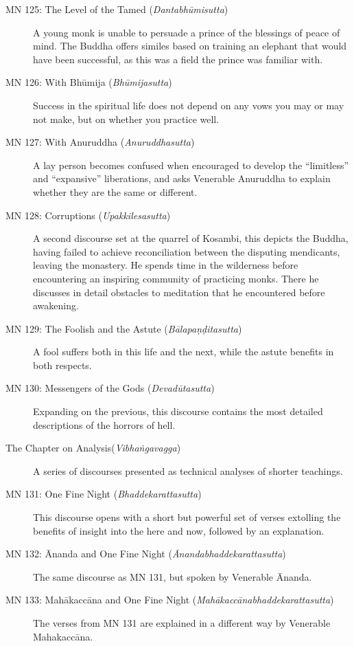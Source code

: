 \documentclass[12pt,openany]{book}%
\begin{document}
\begin{description}
\item[MN 125: The Level of the Tamed (\textit{\textsanskrit{Dantabhūmisutta}})] A young monk is unable to persuade a prince of the blessings of peace of mind. The Buddha offers similes based on training an elephant that would have been successful, as this was a field the prince was familiar with.%
\item[MN 126: With \textsanskrit{Bhūmija} (\textit{\textsanskrit{Bhūmijasutta}})] Success in the spiritual life does not depend on any vows you may or may not make, but on whether you practice well.%
\item[MN 127: With Anuruddha (\textit{\textsanskrit{Anuruddhasutta}})] A lay person becomes confused when encouraged to develop the “limitless” and “expansive” liberations, and asks Venerable Anuruddha to explain whether they are the same or different.%
\item[MN 128: Corruptions (\textit{\textsanskrit{Upakkilesasutta}})] A second discourse set at the quarrel of Kosambi, this depicts the Buddha, having failed to achieve reconciliation between the disputing mendicants, leaving the monastery. He spends time in the wilderness before encountering an inspiring community of practicing monks. There he discusses in detail obstacles to meditation that he encountered before awakening.%
\item[MN 129: The Foolish and the Astute (\textit{\textsanskrit{Bālapaṇḍitasutta}})] A fool suffers both in this life and the next, while the astute benefits in both respects.%
\item[MN 130: Messengers of the Gods (\textit{\textsanskrit{Devadūtasutta}})] Expanding on the previous, this discourse contains the most detailed descriptions of the horrors of hell.%
\item[The Chapter on Analysis(\textit{\textsanskrit{Vibhaṅgavagga}})] A series of discourses presented as technical analyses of shorter teachings.%
\item[MN 131: One Fine Night (\textit{\textsanskrit{Bhaddekarattasutta}})] This discourse opens with a short but powerful set of verses extolling the benefits of insight into the here and now, followed by an explanation.%
\item[MN 132: Ānanda and One Fine Night (\textit{\textsanskrit{Ānandabhaddekarattasutta}})] The same discourse as MN 131, but spoken by Venerable Ānanda.%
\item[MN 133: \textsanskrit{Mahākaccāna} and One Fine Night (\textit{\textsanskrit{Mahākaccānabhaddekarattasutta}})] The verses from MN 131 are explained in a different way by Venerable \textsanskrit{Mahakaccāna}.%

\end{description}
\end{document}
